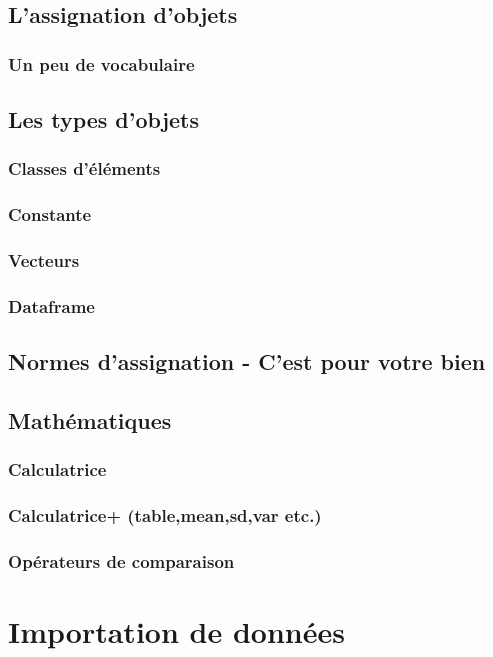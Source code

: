 \documentclass[10.5pt,a4paper]{article}
\begin{document}
  \subsection{L'assignation d'objets}
    \subsubsection{Un peu de vocabulaire}
  \subsection{Les types d'objets}
    \subsubsection{Classes d'éléments}
    \subsubsection{Constante}
    \subsubsection{Vecteurs}
    \subsubsection{Dataframe}
  \subsection{Normes d'assignation - C'est pour votre bien}
  \subsection{Mathématiques}
    \subsubsection{Calculatrice}
    \subsubsection{Calculatrice+ (table,mean,sd,var etc.)}
    \subsubsection{Opérateurs de comparaison}

  
\section{Importation de données}
\end{document}
